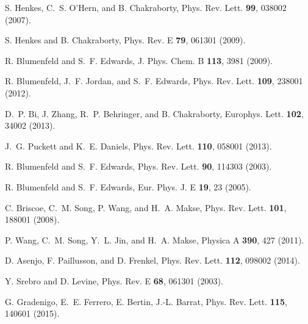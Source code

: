 \documentclass[prl,twocolumn,floats,floatfix,aps,superscriptaddress,showpacs]{revtex4-1}
\begin{document}
\begin{thebibliography}{99}
S. Henkes, C.~S. O’Hern, and B. Chakraborty, Phys. Rev. Lett. {\bf 99}, 038002 (2007).

S. Henkes and B. Chakraborty, Phys. Rev. E {\bf 79}, 061301 (2009).

R. Blumenfeld and S.~F. Edwards, J. Phys. Chem. B {\bf 113}, 3981 (2009).

R. Blumenfeld, J.~F. Jordan, and S.~F. Edwards, Phys. Rev. Lett. {\bf 109}, 238001 (2012).

D.~P. Bi, J. Zhang, R.~P. Behringer, and B. Chakraborty, Europhys. Lett. {\bf 102}, 34002 (2013).

J.~G. Puckett and K.~E. Daniels, Phys. Rev. Lett. {\bf 110}, 058001 (2013).

R. Blumenfeld and S.~F. Edwards, Phys. Rev. Lett. {\bf 90}, 114303 (2003).

R. Blumenfeld and S.~F. Edwards, Eur. Phys. J. E {\bf 19}, 23 (2005).

C. Briscoe, C.~M. Song, P. Wang, and H.~A. Makse, Phys. Rev. Lett. {\bf 101}, 188001 (2008).

P. Wang, C.~M. Song, Y.~L. Jin, and H.~A. Makse, Physica A {\bf 390}, 427 (2011).

D. Asenjo, F. Paillusson, and D. Frenkel, Phys. Rev. Lett. {\bf 112}, 098002 (2014).

Y. Srebro and D. Levine, Phys. Rev. E {\bf 68}, 061301 (2003).

G. Gradenigo, E.~E. Ferrero, E. Bertin, J.-L. Barrat, Phys. Rev. Lett. {\bf 115}, 140601 (2015).


\end{thebibliography}
\end{document}
